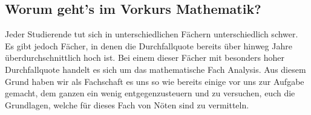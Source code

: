 \subsection{Worum geht's im Vorkurs Mathematik?}
Jeder Studierende tut sich in unterschiedlichen Fächern unterschiedlich schwer.
Es gibt jedoch Fächer, in denen die Durchfallquote bereits über hinweg Jahre überdurchschnittlich hoch ist.
Bei einem dieser Fächer mit besonders hoher Durchfallquote handelt es sich um das mathematische Fach Analysis.
Aus diesem Grund haben wir als Fachschaft es uns so wie bereits einige vor uns zur Aufgabe gemacht, dem ganzen ein wenig entgegenzusteuern und zu versuchen, euch die Grundlagen, welche für dieses Fach von Nöten sind zu vermitteln.